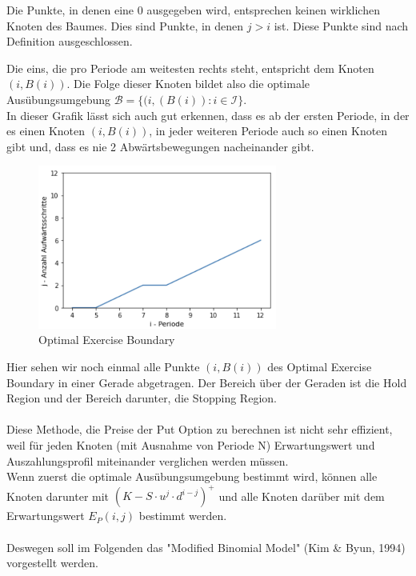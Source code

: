 \documentclass[12pt,a4paper]{article}
\begin{document}
\begin{text}
 Die Punkte, in denen eine 0 ausgegeben wird, entsprechen keinen wirklichen Knoten des Baumes. Dies sind Punkte, in denen $j > i$ ist. Diese Punkte sind nach Definition ausgeschlossen.

\newpage
Die eins, die pro Periode am weitesten rechts steht, entspricht dem Knoten $(i,B(i))$. Die Folge dieser Knoten bildet also die optimale Ausübungsumgebung 
$ \mathcal{B} = \{ (i,(B(i)) : i \in \mathcal{I} \}$.
\\
In dieser Grafik lässt sich auch gut erkennen, dass es ab der ersten Periode, in der es einen Knoten $(i,B(i))$, in jeder weiteren Periode auch so einen Knoten gibt und, dass es nie 2 Abwärtsbewegungen nacheinander gibt.

\begin{figure}[h]
\begin{center}
 \includegraphics[width=0.7\textwidth]{ArrayBild2.PNG}
 \caption{Optimal Exercise Boundary}
\end{center}
\end{figure}

\newpage
Hier sehen wir noch einmal alle Punkte $(i,B(i))$ des Optimal Exercise Boundary in einer Gerade abgetragen. Der Bereich über der Geraden ist die Hold Region und der Bereich darunter, die Stopping Region.
\\\\
Diese Methode, die Preise der Put Option zu berechnen ist nicht sehr effizient, weil für jeden Knoten (mit Ausnahme von Periode N) Erwartungswert und Auszahlungsprofil miteinander verglichen werden müssen.
\\
Wenn zuerst die optimale Ausübungsumgebung bestimmt wird, können alle Knoten darunter mit $(K - S \cdot u^j \cdot d^{i-j})^+$ und alle Knoten darüber mit dem Erwartungswert ${E}_P(i,j)$ bestimmt werden.
\\\\
Deswegen soll im Folgenden das "Modified Binomial Model" (Kim \& Byun, 1994) vorgestellt werden.



\end{text}
\end{document}
